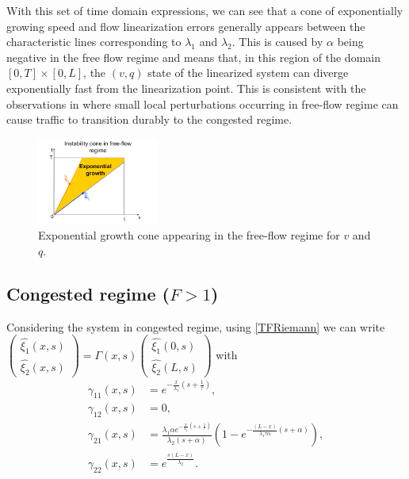 \documentclass[a4paper, 10pt, conference]{ieeeconf}      %
\begin{document}
With this set of time domain expressions, we can see that a cone of exponentially growing speed and flow linearization errors generally appears between the characteristic lines corresponding to $\lambda_{1}$ and $\lambda_{2}$. This is caused by $\alpha$ being negative in the free flow regime and means that, in this region of the domain $\left[0,T\right] \times \left[0,L\right]$, the $\left(v,q\right)$ state of the linearized system can diverge exponentially fast from the linearization point. This is consistent with the observations in \cite{PhysRevLett.79.4030} where small local perturbations occurring in free-flow regime can cause traffic to transition durably to the congested regime.

\begin{figure}
\begin{centering}
\includegraphics[width=4cm]{Exp-growth}
\par\end{centering}
\protect\caption{Exponential growth cone appearing in the free-flow regime for $v$ and $q$.\label{Exp-growth}}
\end{figure}

\subsection{Congested regime ($F>1$)}
Considering the system in congested regime, using \eqref{TFRiemann} we can write
{\footnotesize
$\label{vqcongested}
\begin{pmatrix}
	\hat{\xi_{1}}(x,s)\\
	\hat{\xi_{2}}(x,s)
\end{pmatrix} = 
\Gamma(x,s)
\begin{pmatrix}
	\hat{\xi_{1}}\left(0,s\right)\\
	\hat{\xi_{2}}\left(L,s\right)
\end{pmatrix}
$
}
with 
{\footnotesize
\begin{subequations}
\begin{align}
\gamma_{11}\left(x,s\right)&=
e^{-\frac{x}{\lambda_{1}}\left(s+\frac{1}{\tau}\right)} , \\
\gamma_{12}\left(x,s\right)&=0, \\
\gamma_{21}\left(x,s\right)&=
\frac{\lambda_{1} \alpha e^{-\frac{x}{\lambda_{1}} \left( s + \frac{1}{\tau} \right)}}
{\lambda_{2}\left(s + \alpha\right)}
\left(
	1 -
	e^{-\frac{\left(L - x\right)
		}{
		\lambda_{1}\tau\alpha
		}
		\left(s+\alpha\right)
		}
\right)
, \\
\gamma_{22}\left(x,s\right)&=e^{\frac{s\left(L-x\right)}{\lambda_{2}}}.
\end{align}
\end{subequations}
}
\end{document}
